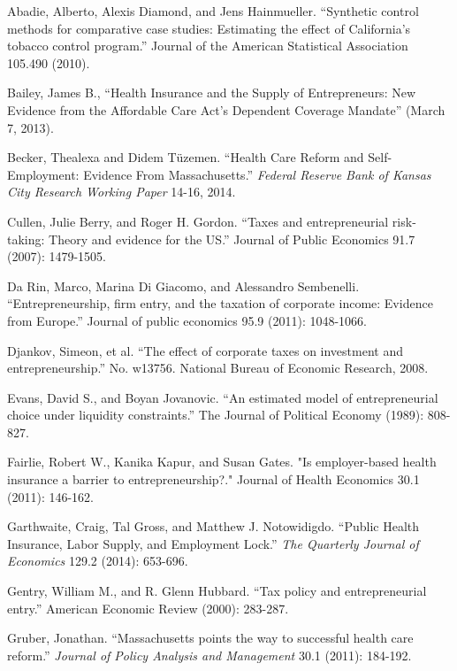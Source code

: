\documentclass[12pt]{article}
\begin{document}
\newpage

\begin{thebibliography}{99}

Abadie, Alberto, Alexis Diamond, and Jens Hainmueller. ``Synthetic control methods for comparative case studies: Estimating the effect of California’s tobacco control program.'' Journal of the American Statistical Association 105.490 (2010).

Bailey, James B., ``Health Insurance and the Supply of Entrepreneurs: New Evidence from the Affordable Care Act's Dependent Coverage Mandate'' (March 7, 2013). 

Becker, Thealexa and Didem T\"{u}zemen. ``Health Care Reform and Self-Employment: Evidence From Massachusetts.'' \emph{Federal Reserve Bank of Kansas City Research Working Paper} 14-16, 2014.

Cullen, Julie Berry, and Roger H. Gordon. ``Taxes and entrepreneurial risk-taking: Theory and evidence for the US.'' Journal of Public Economics 91.7 (2007): 1479-1505.

Da Rin, Marco, Marina Di Giacomo, and Alessandro Sembenelli. ``Entrepreneurship, firm entry, and the taxation of corporate income: Evidence from Europe.'' Journal of public economics 95.9 (2011): 1048-1066.

Djankov, Simeon, et al. ``The effect of corporate taxes on investment and entrepreneurship.'' No. w13756. National Bureau of Economic Research, 2008.

Evans, David S., and Boyan Jovanovic. ``An estimated model of entrepreneurial choice under liquidity constraints.'' The Journal of Political Economy (1989): 808-827.

Fairlie, Robert W., Kanika Kapur, and Susan Gates. "Is employer-based health insurance a barrier to entrepreneurship?." Journal of Health Economics 30.1 (2011): 146-162.

Garthwaite, Craig, Tal Gross, and Matthew J. Notowidigdo. ``Public Health Insurance, Labor Supply, and Employment Lock.'' \emph{The Quarterly Journal of Economics} 129.2 (2014): 653-696.

Gentry, William M., and R. Glenn Hubbard. ``Tax policy and entrepreneurial entry.'' American Economic Review (2000): 283-287.

Gruber, Jonathan. ``Massachusetts points the way to successful health care reform.'' \emph{Journal of Policy Analysis and Management} 30.1 (2011): 184-192.


\end{thebibliography}
\end{document}
